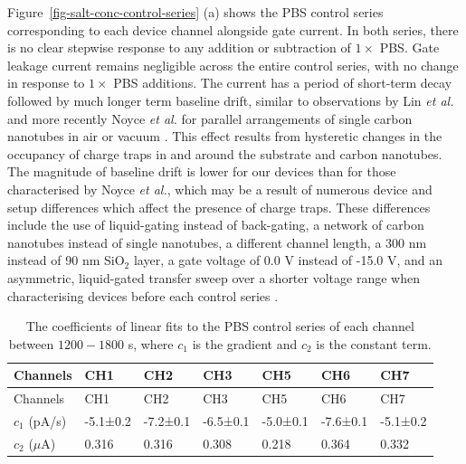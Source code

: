 \documentclass[
  a4paper,
]{scrbook}
\begin{document}
Figure~\ref{fig-salt-conc-control-series} (a) shows the PBS control
series corresponding to each device channel alongside gate current. In
both series, there is no clear stepwise response to any addition or
subtraction of \(1 \times\) PBS. Gate leakage current remains negligible
across the entire control series, with no change in response to
\(1 \times\) PBS additions. The current has a period of short-term decay
followed by much longer term baseline drift, similar to observations by
Lin \emph{et al.} and more recently Noyce \emph{et al.} for parallel
arrangements of single carbon nanotubes in air or vacuum
\autocite{Lin2006,Noyce2019}. This effect results from hysteretic
changes in the occupancy of charge traps in and around the substrate and
carbon nanotubes. The magnitude of baseline drift is lower for our
devices than for those characterised by Noyce \emph{et al.}, which may
be a result of numerous device and setup differences which affect the
presence of charge traps. These differences include the use of
liquid-gating instead of back-gating, a network of carbon nanotubes
instead of single nanotubes, a different channel length, a 300 nm
instead of 90 nm SiO\(_2\) layer, a gate voltage of 0.0 V instead of
-15.0 V, and an asymmetric, liquid-gated transfer sweep over a shorter
voltage range when characterising devices before each control series
\autocite{Noyce2019}.

\hypertarget{tbl-linear-fits}{}
\begin{longtable}[]{@{}lllllll@{}}
\caption{\label{tbl-linear-fits}The coefficients of linear fits to the
PBS control series of each channel between \(1200-1800\) s, where
\(c_1\) is the gradient and \(c_2\) is the constant term.\\
}\tabularnewline
\toprule\noalign{}
Channels & CH1 & CH2 & CH3 & CH5 & CH6 & CH7 \\
\midrule\noalign{}
\endfirsthead
\toprule\noalign{}
Channels & CH1 & CH2 & CH3 & CH5 & CH6 & CH7 \\
\midrule\noalign{}
\endhead
\bottomrule\noalign{}
\endlastfoot
\(c_1\) (pA/s) & -5.1±0.2 & -7.2±0.1 & -6.5±0.1 & -5.0±0.1 & -7.6±0.1 &
-5.1±0.2 \\
\(c_2\) (\(\mu\)A) & 0.316 & 0.316 & 0.308 & 0.218 & 0.364 & 0.332 \\
\end{longtable}
\end{document}
